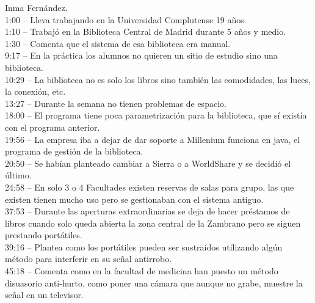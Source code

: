 \documentclass[12pt]{article}
\begin{document}
Inma Fernández.\\
1:00 – Lleva trabajando en la Universidad Complutense 19 años.\\
1:10 – Trabajó en la Biblioteca Central de Madrid durante 5 años y medio.\\
1:30 – Comenta que el sistema de esa biblioteca era manual.\\
9:17 – En la práctica los alumnos no quieren un sitio de estudio sino una biblioteca.\\
10:29 – La biblioteca no es solo los libros sino también las comodidades, las luces, la conexión, etc.\\
13:27 – Durante la semana no tienen problemas de espacio.\\
18:00 – El programa tiene poca parametrización para la biblioteca, que sí existía con el programa anterior.\\
19:56 – La empresa iba a dejar de dar soporte a Millenium funciona en java, el programa de gestión de la biblioteca.\\
20:50 – Se habían planteado cambiar a Sierra o a WorldShare y se decidió el último.\\
24:58 – En solo 3 o 4 Facultades existen reservas de salas para grupo, las que existen tienen mucho uso pero se gestionaban con el sistema antiguo.\\
37:53 – Durante las aperturas extraordinarias se deja de hacer préstamos de libros cuando solo queda abierta la zona central de la Zambrano pero se siguen prestando portátiles.\\
39:16 – Plantea como los portátiles pueden ser sustraídos utilizando algún método para interferir en su señal antirrobo.\\
45:18 – Comenta como en la facultad de medicina han puesto un método disuasorio anti-hurto, como poner una cámara que aunque no grabe, muestre la señal en un televisor.\\
\end{document}
